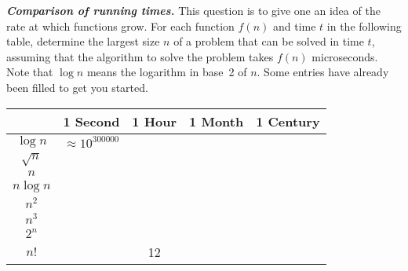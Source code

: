{\large\bfseries\itshape Comparison of running times.} 
This question is to give one an idea of the rate at which functions
grow. For each function $f(n)$ and time $t$ in the following table,
determine the largest  size $n$ of a problem that can be solved in time
$t$, assuming that the algorithm to solve the problem takes $f(n)$
microseconds. Note that $\log  n$ means the logarithm in base~2 of $n$.
Some entries have already been filled to get you started.

\begin{center}
\renewcommand{\arraystretch}{1.4}
\begin{tabular}{|c|c|c|c|c|}
\hline
                  & 1 Second & 1 Hour & 1 Month & 1 Century \\  \hline  \hline
$\log  n$ & $\approx  10^{300000}$  &      &       &         \\  \hline
$\sqrt  n$ &       &      &       &         \\  \hline
$n$      &        &      &       &         \\  \hline
$n\log  n$ &       &      &       &         \\  \hline
$n^2$    &        &      &       &         \\  \hline
$n^3$    &        &      &       &         \\  \hline
$2^n$    &        &      &       &         \\  \hline
$n!$     &        &  12  &       &         \\  

\hline
\end{tabular}
\end{center}


